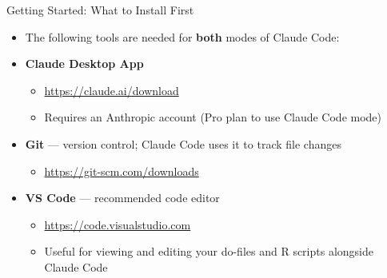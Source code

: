 \documentclass[hyperref={pdfpagelabels=false}]{beamer}
\begin{document}
\begin{frame}{Getting Started: What to Install First}

\begin{itemize}
	\item The following tools are needed for \textbf{both} modes of Claude Code:
	\vspace{0.3cm}
	\item \textbf{Claude Desktop App}
	\vspace{0.1cm}
	\begin{itemize}
		\item \url{https://claude.ai/download}
		\vspace{0.1cm}
		\item Requires an Anthropic account (Pro plan to use Claude Code mode)
	\end{itemize}
	\vspace{0.3cm}
	\item \textbf{Git} --- version control; Claude Code uses it to track file changes
	\vspace{0.1cm}
	\begin{itemize}
		\item \url{https://git-scm.com/downloads}
	\end{itemize}
	\vspace{0.3cm}
	\item \textbf{VS Code} --- recommended code editor
	\vspace{0.1cm}
	\begin{itemize}
		\item \url{https://code.visualstudio.com}
		\vspace{0.1cm}
		\item Useful for viewing and editing your do-files and R scripts alongside Claude Code
	\end{itemize}
\end{itemize}

\end{frame}


\end{document}
